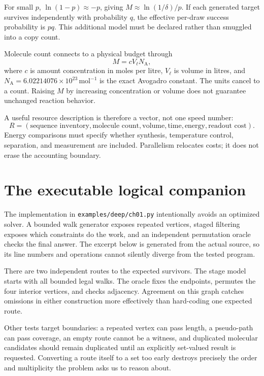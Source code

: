 For small $p$, $\ln(1-p)\approx-p$, giving $M\approx\ln(1/\delta)/p$. If each generated target survives independently with probability $q$, the effective per-draw success probability is $pq$. This additional model must be declared rather than smuggled into a copy count.

Molecule count connects to a physical budget through
\[
 M=cV_{\ell}N_{\mathrm A},
\]
where $c$ is amount concentration in moles per litre, $V_{\ell}$ is volume in litres, and $N_{\mathrm A}=6.02214076\times10^{23}\,\mathrm{mol}^{-1}$ is the exact Avogadro constant.\cite{si} The units cancel to a count. Raising $M$ by increasing concentration or volume does not guarantee unchanged reaction behavior.

A useful resource description is therefore a vector, not one speed number:
\[
 R=(\text{sequence inventory},\text{molecule count},\text{volume},
       \text{time},\text{energy},\text{readout cost}).
\]
Energy comparisons must specify whether synthesis, temperature control, separation, and measurement are included. Parallelism relocates costs; it does not erase the accounting boundary.

\section{The executable logical companion}\label{sec:code}
The implementation in \texttt{examples/deep/ch01.py} intentionally avoids an optimized solver. A bounded walk generator exposes repeated vertices, staged filtering exposes which constraints do the work, and an independent permutation oracle checks the final answer. The excerpt below is generated from the actual source, so its line numbers and operations cannot silently diverge from the tested program.


There are two independent routes to the expected survivors. The stage model starts with all bounded legal walks. The oracle fixes the endpoints, permutes the four interior vertices, and checks adjacency. Agreement on this graph catches omissions in either construction more effectively than hard-coding one expected route.

Other tests target boundaries: a repeated vertex can pass length, a pseudo-path can pass coverage, an empty route cannot be a witness, and duplicated molecular candidates should remain duplicated until an explicitly set-valued result is requested. Converting a route itself to a set too early destroys precisely the order and multiplicity the problem asks us to reason about.

